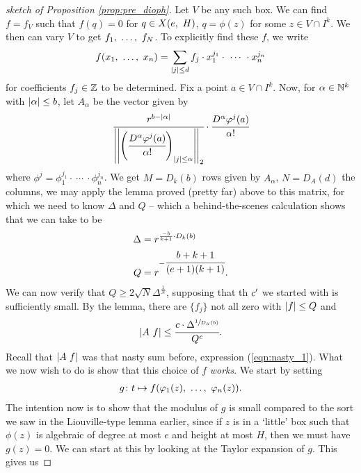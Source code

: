 \begin{proof}[sketch of Proposition \ref{prop:pre_dioph}]
  Let $V$ be any such box. We can find $f = f_V$ such that $f(q) = 0$ for $q \in \XeH[H]{e}$, $q = \phi(z)$ for some $z \in V \cap I^k$. We then can vary $V$ to get $\vonevm{f}{N}$. To explicitly find these $f$, we write
    \begin{align*}
      f(\vonevm{x}{n}) = \sum_{\norm{j} \leq d} f_j \cdot x_1^{j_1} \cdot \ \cdots \ \cdot x_n^{j_n}
    \end{align*}
  for coefficients $f_j \in \Z$ to be determined. Fix a point $a \in V \cap I^k$. Now, for $\alpha \in \N^k$ with $\norm{\alpha} \leq b$, let $A_{\alpha}$ be the vector given by
    \begin{align}
      \cfrac{r^{b - \norm{\alpha}}}{\left\vert\left\vert \left( \cfrac{D^{\alpha} \phi^{j} (a)}{\alpha !} \right)_{\norm{j} \leq \alpha} \right\vert\right\vert_{2} } \cdot \cfrac{D^{\alpha} \phi^{j}(a)}{\alpha !}
      \label{eqn:nasty_1}
    \end{align}
  where $\phi^{j} = \phi_1^{j_1} \cdot \ \cdots \ \cdot \phi_n^{j_n}$. We get $M = D_k(b)$ rows given by $A_{\alpha}$, $N = D_A(d)$ the columns, we may apply the lemma proved (pretty far) above to this matrix, for which we need to know $\Delta$ and $Q$ -- which a behind-the-scenes calculation shows that we can take to be
    \begin{align*}
      \Delta &= r^{\frac{-b}{k+1} \cdot D_k(b)}  \\
      Q &= r^{- \cfrac{b + k + 1}{(e + 1)(k + 1)}}.
    \end{align*}
    We can now verify that $Q \geq 2 \sqrt{N} \Delta^{\frac{1}{N}}$, supposing that th  $\pri{c}$ we started with is sufficiently small. By the lemma, there are $\{f_j\}$ not all zero with $\norm{f} \leq Q$ and 
      \begin{align*}
        \norm{A \ f} \leq \cfrac{c \cdot \Delta^{\sfrac{1}{D_K(b)}}}{Q^c}.
      \end{align*}
      Recall that $\norm{A \ f}$ was that nasty sum before, expression (\ref{eqn:nasty_1}). What we now wish to do is show that this choice of $f$ \emph{works}. We start by setting
        \begin{align*}
          \funcdef{g}{t}{f(\phi_1(z), \ \hdots, \ \phi_n(z))}.
        \end{align*}
      The intention now is to show that the modulus of $g$ is small compared to the sort we saw in the Liouville-type lemma earlier, since if $z$ is in a `little' box such that $\phi(z)$ is algebraic of degree at most $e$ and height at most $H$, then we must have $g(z) = 0$. We can start at this by looking at the Taylor expansion of $g$. This gives us

\end{proof}
